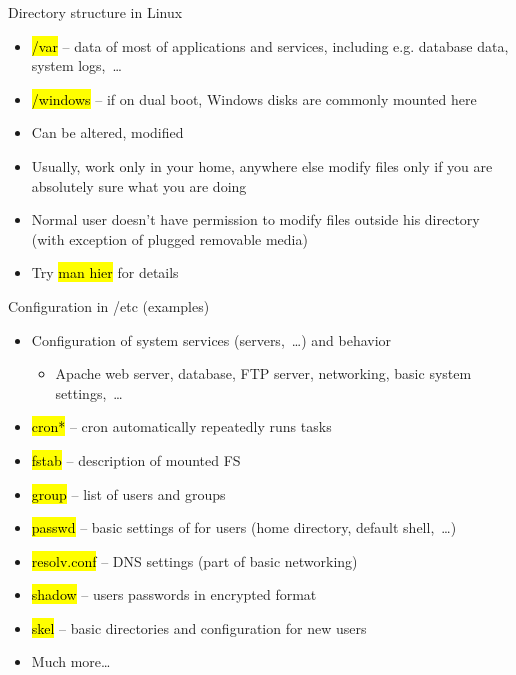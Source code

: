 \documentclass[compress, ucs, xelatex, 11pt, xcolor=svgnames,
  hyperref={
    bookmarks=true,
    unicode=true,
    colorlinks=true,
    pdftitle={Linux, command line and MetaCentrum},
    plainpages=false,
    pdfauthor={Vojtech Zeisek},
    pdfsubject={Course about use of Linux command line, writing shell scripts and using MetaCentrum of CESNET},
    pdfcreator={XeLaTeX},
    pdfkeywords={Linux, GNU, BASH, shell, command line, MetaCentrum},
    linkcolor=Red,
    anchorcolor=Blue,
    citecolor=Purple,
    filecolor=DodgerBlue,
    menucolor=DarkOrchid,
    urlcolor=DeepSkyBlue,
    pdftex},
  url={hyphens, lowtilde} %
  ]{beamer}
\renewcommand{\texttt}[1]{\hl{\ttfamily #1}}
\renewcommand{\alert}[1]{\textcolor{red}{#1}}
\begin{document}
\begin{frame}[allowframebreaks]{Directory structure in Linux}
\begin{itemize}
  \item \alert{\texttt{/var}} -- data of most of applications and services, including e.g. database data, system logs,~\ldots
  \item \alert{\texttt{/windows}} -- if on dual boot, Windows disks are commonly mounted here
  \item Can be altered, modified
  \item Usually, work only in your home, anywhere else modify files only if you are absolutely sure what you are doing
  \item Normal user doesn't have permission to modify files outside his directory (with exception of plugged removable media)
  \item Try \texttt{man hier} for details
\end{itemize}
\end{frame}

\begin{frame}{Configuration in /etc (examples)}
\begin{itemize}
  \item Configuration of system services (servers,~\ldots) and behavior
  \begin{itemize}
    \item Apache web server, database, FTP server, networking, basic system settings,~\ldots
  \end{itemize}
  \item \texttt{cron*} -- cron automatically repeatedly runs tasks
  \item \texttt{fstab} -- description of mounted FS
  \item \texttt{group} -- list of users and groups
  \item \texttt{passwd} -- basic settings of for users (home directory, default shell,~\ldots)
  \item \texttt{resolv.conf} --  DNS settings (part of basic networking)
  \item \texttt{shadow} -- users passwords in encrypted format
  \item \texttt{skel} -- basic directories and configuration for new users
  \item Much more\ldots
\end{itemize}
\end{frame}
\end{document}
